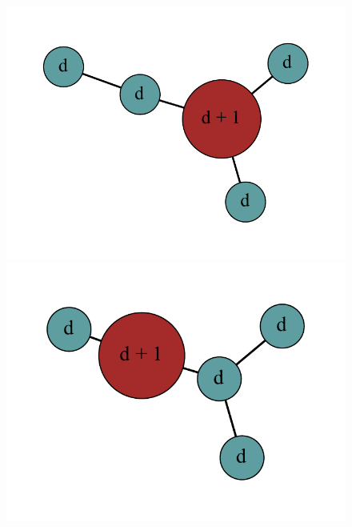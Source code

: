 \documentclass[12pt]{article}
\theoremstyle{plain}
\theoremstyle{definition}
\theoremstyle{remark}
\begin{document}
		
		\begin{figure}[htb]
					\centering
\includegraphics[scale=0.4]{Superabundance/MaxDegree3Trees/0011001010[2,1,1,1,4].pdf}
\includegraphics[scale=0.4]{Superabundance/MaxDegree3Trees/0011001010[3,1,1,1,3].pdf}

\end{figure}
\end{document}

